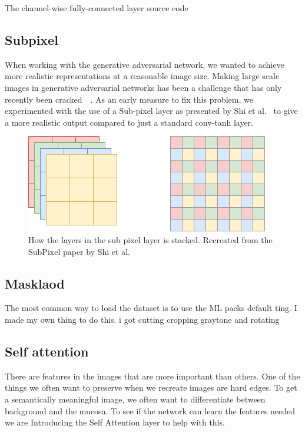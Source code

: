\begin{minipage}{\linewidth}
\begin{listing}

\caption{The channel-wise fully-connected layer source code}
\label{listing:CWDense}
\end{listing}
\end{minipage}

\subsection{Subpixel}
When working with the generative adversarial network, we wanted to achieve more realistic representations at a reasonable image size. 
Making large scale images in generative adversarial networks has been a challenge that has only recently been cracked~\cite{DBLP:journals/corr/DentonCSF15}~\cite{DBLP:journals/corr/abs-1809-11096}.
As an early measure to fix this problem, we experimented with the use of a Sub-pixel layer as presented by Shi et al.~\cite{DBLP:journals/corr/ShiCHTABRW16} to give a more realistic output compared to just a standard conv-tanh layer.

\begin{figure}
\centering
\includegraphics[scale=0.8]{methodology/figures/SubPixel.png}
\caption{How the layers in the sub pixel layer is stacked. Recreated from the SubPixel paper by Shi et al.~\cite{DBLP:journals/corr/ShiCHTABRW16}}
\label{fig:SubPixel}
\end{figure}






\subsection{Masklaod}
The most common way to load the dataset is to use the ML packs default ting.
I made my own thing to do this. i got cutting cropping graytone and rotating

\subsection{Self attention}
There are features in the images that are more important than others. One of the things we often want to preserve when we recreate images are hard edges. To get a semantically meaningful image,  we often want to differentiate between background and the mucosa. 
To see if the network can learn the features needed we are Introducing the Self Attention layer to help with this. 

